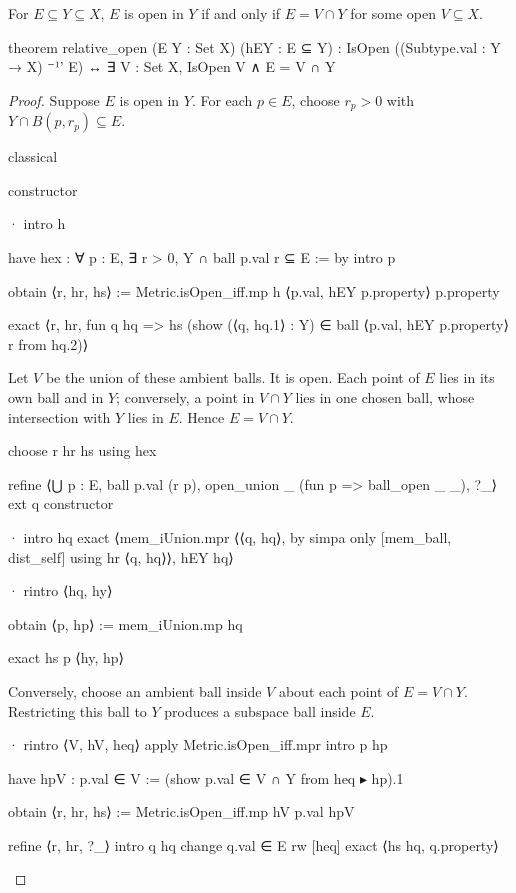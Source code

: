 \begin{proposition}
  \label{an1:thm:open-set-relative-to-subspace}
  For $E\subseteq Y\subseteq X$, $E$ is open in $Y$ if and only if $E=V\cap Y$ for some open
  $V\subseteq X$.

  \begin{lean}
    theorem relative_open (E Y : Set X) (hEY : E ⊆ Y) :
        IsOpen ((Subtype.val : Y → X) ⁻¹' E) ↔
          ∃ V : Set X, IsOpen V ∧ E = V ∩ Y
  \end{lean}
\end{proposition}

\begin{proof}
  Suppose $E$ is open in $Y$.
  For each $p\in E$, choose $r_p>0$ with $Y\cap B(p,r_p)\subseteq E$.

  \begin{lean}
    classical

    constructor

    · intro h

      have hex : ∀ p : E, ∃ r > 0, Y ∩ ball p.val r ⊆ E := by
        intro p

        obtain ⟨r, hr, hs⟩ := Metric.isOpen_iff.mp h ⟨p.val, hEY p.property⟩ p.property

        exact ⟨r, hr, fun q hq =>
          hs (show (⟨q, hq.1⟩ : Y) ∈ ball ⟨p.val, hEY p.property⟩ r from hq.2)⟩
  \end{lean}

  Let $V$ be the union of these ambient balls.
  It is open.
  Each point of $E$ lies in its own ball and in $Y$; conversely, a point in $V\cap Y$ lies in one
  chosen ball, whose intersection with $Y$ lies in $E$.
  Hence $E=V\cap Y$.

  \begin{lean}
    choose r hr hs using hex

    refine ⟨⋃ p : E, ball p.val (r p), open_union _ (fun p => ball_open _ _), ?_⟩
    ext q
    constructor

    · intro hq
      exact ⟨mem_iUnion.mpr ⟨⟨q, hq⟩, by simpa only [mem_ball, dist_self] using hr ⟨q, hq⟩⟩, hEY hq⟩

    · rintro ⟨hq, hy⟩

      obtain ⟨p, hp⟩ := mem_iUnion.mp hq

      exact hs p ⟨hy, hp⟩
  \end{lean}

  Conversely, choose an ambient ball inside $V$ about each point of $E=V\cap Y$.
  Restricting this ball to $Y$ produces a subspace ball inside $E$.

  \begin{lean}
    · rintro ⟨V, hV, heq⟩
      apply Metric.isOpen_iff.mpr
      intro p hp

      have hpV : p.val ∈ V := (show p.val ∈ V ∩ Y from heq ▸ hp).1

      obtain ⟨r, hr, hs⟩ := Metric.isOpen_iff.mp hV p.val hpV

      refine ⟨r, hr, ?_⟩
      intro q hq
      change q.val ∈ E
      rw [heq]
      exact ⟨hs hq, q.property⟩
  \end{lean}

\end{proof}
